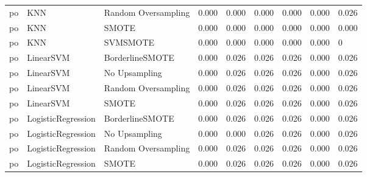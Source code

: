 \begin{tabular}{lllllllll}
      po &                          KNN & Random Oversampling & 0.000 &                     0.000 &                 0.000 &                  0.000 &                                   0.000 &     0.026 \\
      po &                          KNN &               SMOTE & 0.000 &                     0.000 &                 0.000 &                  0.000 &                                   0.000 &     0.000 \\
      po &                          KNN &            SVMSMOTE & 0.000 &                     0.000 &                 0.000 &                  0.000 &                                   0.000 &         0 \\
      po &                    LinearSVM &     BorderlineSMOTE & 0.000 &                     0.026 &                 0.026 &                  0.026 &                                   0.000 &     0.026 \\
      po &                    LinearSVM &       No Upsampling & 0.000 &                     0.026 &                 0.026 &                  0.026 &                                   0.000 &     0.026 \\
      po &                    LinearSVM & Random Oversampling & 0.000 &                     0.026 &                 0.026 &                  0.026 &                                   0.000 &     0.026 \\
      po &                    LinearSVM &               SMOTE & 0.000 &                     0.026 &                 0.026 &                  0.026 &                                   0.000 &     0.026 \\
      po &           LogisticRegression &     BorderlineSMOTE & 0.000 &                     0.026 &                 0.026 &                  0.026 &                                   0.000 &     0.026 \\
      po &           LogisticRegression &       No Upsampling & 0.000 &                     0.000 &                 0.026 &                  0.026 &                                   0.000 &     0.026 \\
      po &           LogisticRegression & Random Oversampling & 0.000 &                     0.026 &                 0.026 &                  0.026 &                                   0.000 &     0.026 \\
      po &           LogisticRegression &               SMOTE & 0.000 &                     0.026 &                 0.026 &                  0.026 &                                   0.000 &     0.026 \\

\end{tabular}

